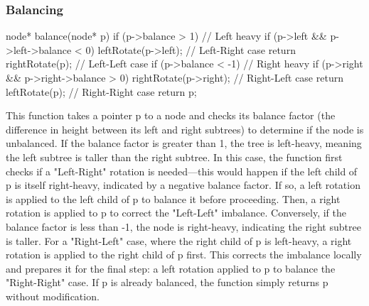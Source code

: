 \documentclass{report}
\begin{document}
\pagebreak 
\subsubsection{Balancing}
\bigbreak \noindent 
\begin{cppcode}
    node* balance(node* p) {
        if (p->balance > 1) {  // Left heavy
            if (p->left && p->left->balance < 0) {
                leftRotate(p->left);  // Left-Right case
            }
            return rightRotate(p);  // Left-Left case
        }
        if (p->balance < -1) {  // Right heavy
            if (p->right && p->right->balance > 0) {
                rightRotate(p->right);  // Right-Left case
            }
            return leftRotate(p);  // Right-Right case
        }
        return p;
    }
\end{cppcode}
\bigbreak \noindent 
This function takes a pointer p to a node and checks its balance factor (the difference in height between its left and right subtrees) to determine if the node is unbalanced. If the balance factor is greater than 1, the tree is left-heavy, meaning the left subtree is taller than the right subtree. In this case, the function first checks if a "Left-Right" rotation is needed—this would happen if the left child of p is itself right-heavy, indicated by a negative balance factor. If so, a left rotation is applied to the left child of p to balance it before proceeding. Then, a right rotation is applied to p to correct the "Left-Left" imbalance.
\bigbreak \noindent 
Conversely, if the balance factor is less than -1, the node is right-heavy, indicating the right subtree is taller. For a "Right-Left" case, where the right child of p is left-heavy, a right rotation is applied to the right child of p first. This corrects the imbalance locally and prepares it for the final step: a left rotation applied to p to balance the "Right-Right" case. If p is already balanced, the function simply returns p without modification.

\pagebreak 
\end{document}
